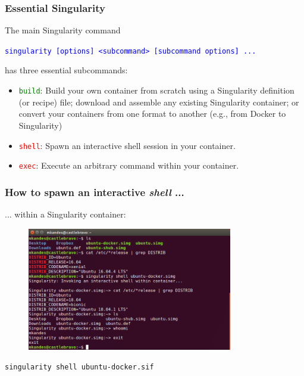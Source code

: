 \documentclass{beamer}
\begin{document}
\begin{frame}
   \frametitle{Essential Singularity}
   The main Singularity command
   \begin{center}
      \textcolor{blue}{\lstinline{singularity [options] <subcommand> [subcommand options] ...}}
   \end{center}
   has three essential subcommands:
   \begin{itemize}
      \setlength\itemsep{1.0em}
      \item \textcolor{green}{\lstinline{build}}: Build your own container
         from scratch using a Singularity definition (or recipe) file;
         download and assemble any existing Singularity container; or
         convert your containers from one format to another (e.g., from
         Docker to Singularity)
      \item \textcolor{red}{\lstinline{shell}}: Spawn an interactive shell
         session in your container.
      \item \textcolor{red}{\lstinline{exec}}: Execute an arbitrary
         command within your container.
   \end{itemize}
\end{frame}

\begin{frame}
   \frametitle{How to spawn an interactive \textit{shell} ...}
   ... within a Singularity container:
   \begin{figure}[htbp]
      \includegraphics[width=0.8\textwidth]{images/singularity-shell-docker.png}
   \end{figure}
   \lstinline{singularity shell ubuntu-docker.sif}
\end{frame}
\end{document}
